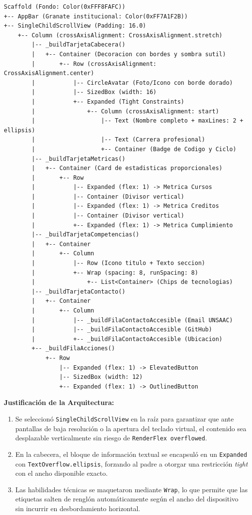 \documentclass[12pt,a4paper]{article}
\begin{document}
\begin{verbatim}
Scaffold (Fondo: Color(0xFFF8FAFC))
+-- AppBar (Granate institucional: Color(0xFF7A1F2B))
+-- SingleChildScrollView (Padding: 16.0)
    +-- Column (crossAxisAlignment: CrossAxisAlignment.stretch)
        |-- _buildTarjetaCabecera()
        |   +-- Container (Decoracion con bordes y sombra sutil)
        |       +-- Row (crossAxisAlignment: CrossAxisAlignment.center)
        |           |-- CircleAvatar (Foto/Icono con borde dorado)
        |           |-- SizedBox (width: 16)
        |           +-- Expanded (Tight Constraints)
        |               +-- Column (crossAxisAlignment: start)
        |                   |-- Text (Nombre completo + maxLines: 2 + ellipsis)
        |                   |-- Text (Carrera profesional)
        |                   +-- Container (Badge de Codigo y Ciclo)
        |-- _buildTarjetaMetricas()
        |   +-- Container (Card de estadisticas proporcionales)
        |       +-- Row
        |           |-- Expanded (flex: 1) -> Metrica Cursos
        |           |-- Container (Divisor vertical)
        |           |-- Expanded (flex: 1) -> Metrica Creditos
        |           |-- Container (Divisor vertical)
        |           +-- Expanded (flex: 1) -> Metrica Cumplimiento
        |-- _buildTarjetaCompetencias()
        |   +-- Container
        |       +-- Column
        |           |-- Row (Icono titulo + Texto seccion)
        |           +-- Wrap (spacing: 8, runSpacing: 8)
        |               +-- List<Container> (Chips de tecnologias)
        |-- _buildTarjetaContacto()
        |   +-- Container
        |       +-- Column
        |           |-- _buildFilaContactoAccesible (Email UNSAAC)
        |           |-- _buildFilaContactoAccesible (GitHub)
        |           +-- _buildFilaContactoAccesible (Ubicacion)
        +-- _buildFilaAcciones()
            +-- Row
                |-- Expanded (flex: 1) -> ElevatedButton
                |-- SizedBox (width: 12)
                +-- Expanded (flex: 1) -> OutlinedButton
\end{verbatim}

\textbf{Justificación de la Arquitectura:} 
\begin{enumerate}
    \item Se seleccionó \texttt{SingleChildScrollView} en la raíz para garantizar que ante pantallas de baja resolución o la apertura del teclado virtual, el contenido sea desplazable verticalmente sin riesgo de \texttt{RenderFlex overflowed}.
    \item En la cabecera, el bloque de información textual se encapsuló en un \texttt{Expanded} con \texttt{TextOverflow.ellipsis}, forzando al padre a otorgar una restricción \textit{tight} con el ancho disponible exacto.
    \item Las habilidades técnicas se maquetaron mediante \texttt{Wrap}, lo que permite que las etiquetas salten de renglón automáticamente según el ancho del dispositivo sin incurrir en desbordamiento horizontal.
\end{enumerate}
\end{document}
